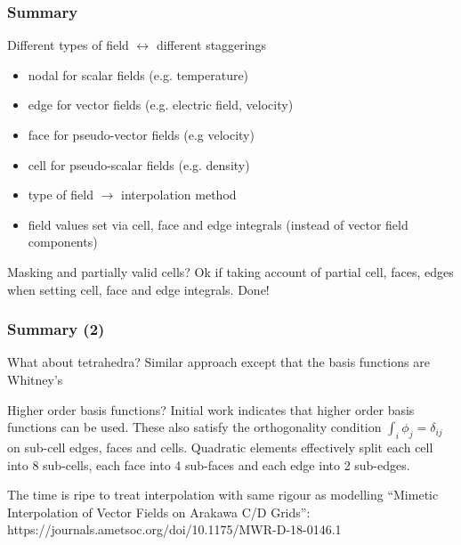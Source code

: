 \documentclass[aspectratio=169]{beamer}
\begin{document}
\begin{frame}[t]
  \frametitle{Summary}
    \begin{block}{Different types of field $\leftrightarrow$ different staggerings}
      \begin{itemize}%
	  \item nodal for scalar fields (e.g. temperature)
	  \item edge for vector fields (e.g. electric field, velocity)
	  \item face for pseudo-vector fields (e.g velocity)
	  \item cell for pseudo-scalar fields (e.g. density)
	  \item type of field $\rightarrow$ interpolation method
      \item field values set via cell, face and edge integrals (instead of vector field components)
    \end{itemize}
    \end{block}
    \begin{block}{Masking and partially valid cells?}
	 Ok if taking account of partial cell, faces, edges when setting cell, face and edge integrals. Done!
  \end{block}
\end{frame}

\begin{frame}[t]
  \frametitle{Summary (2)}
    \begin{block}{What about tetrahedra?}
      Similar approach except that the basis functions are Whitney's
    \end{block}
    \begin{block}{Higher order basis functions?}
    Initial work indicates that higher order basis functions can be used. These also satisfy the orthogonality condition $\int_i \phi_j = \delta_{ij}$
    on sub-cell edges, faces and cells. Quadratic elements effectively 
     split each cell into 8 sub-cells, each face into 4 sub-faces and each edge into 2 sub-edges. 
  \end{block}
    \begin{block}{The time is ripe to treat interpolation with same rigour as modelling}
    	``Mimetic Interpolation of Vector Fields on Arakawa C/D Grids'': https://journals.ametsoc.org/doi/10.1175/MWR-D-18-0146.1
  \end{block}
\end{frame}
\end{document}
